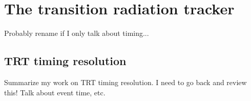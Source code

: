 \chapter[The transition radiation tracker][The transition radiation tracker]
        {The transition radiation tracker}
\label{ch:trt}

{\color{red} Probably rename if I only talk about timing...}

\section{TRT timing resolution}

{\color{red}Summarize my work on TRT timing resolution. I need to go back and
  review this! Talk about event time, etc.}

